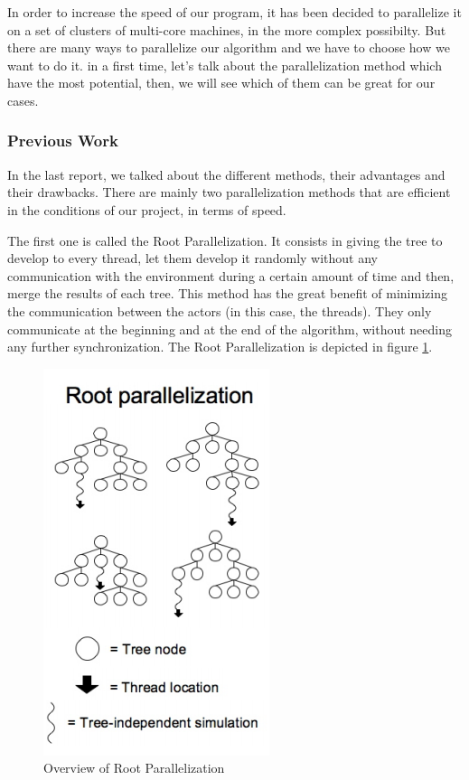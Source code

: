 In order to increase the speed of our program, it has been decided to parallelize it on a set of clusters of multi-core machines, in the more complex possibilty. But there are many ways to parallelize our algorithm and we have to choose how we want to do it. in a first time, let's talk about the parallelization method which have the most potential, then, we will see which of them can be great for our cases.
\subsubsection{Previous Work}
In the last report, we talked about the different methods, their advantages and their drawbacks. There are mainly two parallelization methods that are efficient in the conditions of our project, in terms of speed.

The first one is called the Root Parallelization. It consists in giving the tree to develop to every thread, let them develop it randomly without any communication with the environment
during a certain amount of time and then, merge the results of each tree.
This method has the great benefit of minimizing the communication between the actors (in this case, the threads).
They only communicate at the beginning and at the end of the algorithm, without needing any further synchronization. The Root Parallelization is depicted in figure \ref{fig:root}.

\begin{figure}[!ht] 
\centerline{\includegraphics[scale=0.60]{3Methods/3.1Parallelization_Method/root.png}}
   \caption{Overview of Root Parallelization}
\label{fig:root}
\end{figure}

